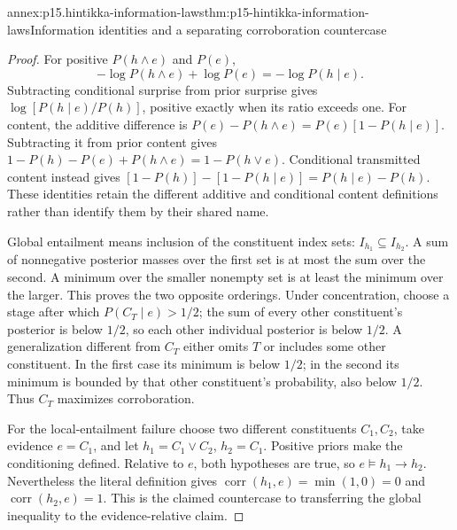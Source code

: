 \begin{annexitem}{annex:p15.hintikka-information-laws}{thm:p15-hintikka-information-laws}{Information identities and a separating corroboration countercase}
\begin{proof}
For positive \(P(h\land e)\) and \(P(e)\),
\[
 -\log P(h\land e)+\log P(e)=-\log P(h\mid e).
\]
Subtracting conditional surprise from prior surprise gives
\(\log[P(h\mid e)/P(h)]\), positive exactly when its ratio
exceeds one. For content, the additive difference is
\(P(e)-P(h\land e)=P(e)[1-P(h\mid e)]\).
Subtracting it from prior content gives
\(1-P(h)-P(e)+P(h\land e)=1-P(h\lor e)\).
Conditional transmitted content instead gives
\([1-P(h)]-[1-P(h\mid e)]=P(h\mid e)-P(h)\).
These identities retain the different additive and conditional content
definitions rather than identify them by their shared name.

Global entailment means inclusion of the constituent index sets:
\(I_{h_1}\subseteq I_{h_2}\). A sum of nonnegative posterior
masses over the first set is at most the sum over the second. A minimum
over the smaller nonempty set is at least the minimum over the larger.
This proves the two opposite orderings. Under concentration, choose a
stage after which \(P(C_T\mid e)>1/2\); the sum of every other
constituent's posterior is below \(1/2\), so each other individual
posterior is below \(1/2\). A generalization different from \(C_T\)
either omits \(T\) or includes some other constituent. In the first
case its minimum is below \(1/2\); in the second its minimum is
bounded by that other constituent's probability, also below \(1/2\).
Thus \(C_T\) maximizes corroboration.

For the local-entailment failure choose two different constituents
\(C_1,C_2\), take evidence \(e=C_1\), and let
\(h_1=C_1\lor C_2\), \(h_2=C_1\). Positive priors make the
conditioning defined. Relative to \(e\), both hypotheses are true,
so \(e\models h_1\to h_2\). Nevertheless the literal definition
gives \(\operatorname{corr}(h_1,e)=\min(1,0)=0\) and
\(\operatorname{corr}(h_2,e)=1\). This is the claimed countercase
to transferring the global inequality to the evidence-relative claim.
\end{proof}
\end{annexitem}

